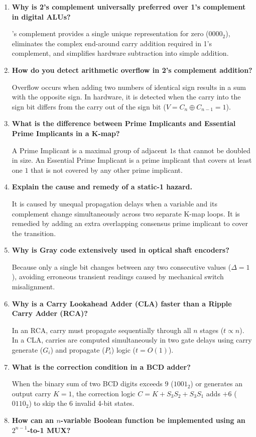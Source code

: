 \documentclass[12pt,a4paper]{article}
\newcommand{\Q}[1]{\textbf{#1}\par\noindent\ignorespaces}
\begin{document}
\begin{tcolorbox}[exambox, title={\textbf{Frequently Asked / Viva Questions}}]
\begin{enumerate}[topsep=0pt, label=\textbf{Q\arabic*.}, itemsep=5pt]
  \item \Q{Why is 2's complement universally preferred over 1's complement in digital ALUs?}
    2's complement provides a single unique representation for zero ($0000_2$), eliminates the complex end-around carry addition required in 1's complement, and simplifies hardware subtraction into simple addition.
  \item \Q{How do you detect arithmetic overflow in 2's complement addition?}
    Overflow occurs when adding two numbers of identical sign results in a sum with the opposite sign. In hardware, it is detected when the carry into the sign bit differs from the carry out of the sign bit ($V = C_n \oplus C_{n-1} = 1$).
  \item \Q{What is the difference between Prime Implicants and Essential Prime Implicants in a K-map?}
    A Prime Implicant is a maximal group of adjacent $1$s that cannot be doubled in size. An Essential Prime Implicant is a prime implicant that covers at least one $1$ that is not covered by any other prime implicant.
  \item \Q{Explain the cause and remedy of a static-1 hazard.}
    It is caused by unequal propagation delays when a variable and its complement change simultaneously across two separate K-map loops. It is remedied by adding an extra overlapping consensus prime implicant to cover the transition.
  \item \Q{Why is Gray code extensively used in optical shaft encoders?}
    Because only a single bit changes between any two consecutive values ($\Delta = 1$), avoiding erroneous transient readings caused by mechanical switch misalignment.
  \item \Q{Why is a Carry Lookahead Adder (CLA) faster than a Ripple Carry Adder (RCA)?}
    In an RCA, carry must propagate sequentially through all $n$ stages ($t \propto n$). In a CLA, carries are computed simultaneously in two gate delays using carry generate ($G_i$) and propagate ($P_i$) logic ($t = O(1)$).
  \item \Q{What is the correction condition in a BCD adder?}
    When the binary sum of two BCD digits exceeds $9$ ($1001_2$) or generates an output carry $K=1$, the correction logic $C = K + S_3 S_2 + S_3 S_1$ adds $+6$ ($0110_2$) to skip the 6 invalid 4-bit states.
  \item \Q{How can an $n$-variable Boolean function be implemented using an $2^{n-1}$-to-1 MUX?}

\end{enumerate}
\end{tcolorbox}
\end{document}
